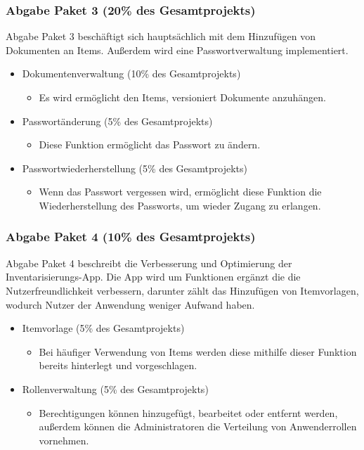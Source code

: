 \documentclass[11pt,a4paper]{report}
\begin{document}
\subsubsection{Abgabe Paket 3 (20\% des Gesamtprojekts)}
Abgabe Paket 3 beschäftigt sich hauptsächlich mit dem Hinzufügen von Dokumenten an Items.
Außerdem wird eine Passwortverwaltung implementiert.
\begin{itemize}

\item
  Dokumentenverwaltung (10\% des Gesamtprojekts)

  \begin{itemize}
  \item
    Es wird ermöglicht den Items, versioniert Dokumente anzuhängen. 
  \end{itemize}
  \item
  Passwortänderung (5\% des Gesamtprojekts)

  \begin{itemize}
  \item
    Diese Funktion ermöglicht das Passwort zu ändern.
  \end{itemize}
  
\item
  Passwortwiederherstellung (5\% des Gesamtprojekts)

  \begin{itemize}
  \item
    Wenn das Passwort vergessen wird, ermöglicht diese Funktion die Wiederherstellung des 				Passworts, um wieder Zugang zu erlangen.
  \end{itemize}
  
\end{itemize}
\newpage
\subsubsection{Abgabe Paket 4 (10\% des Gesamtprojekts)}
Abgabe Paket 4 beschreibt die Verbesserung und Optimierung der Inventarisierungs-App.
Die App wird um Funktionen ergänzt die die Nutzerfreundlichkeit verbessern, darunter zählt das Hinzufügen von Itemvorlagen, wodurch Nutzer der Anwendung weniger Aufwand haben.
\begin{itemize}

\item
  Itemvorlage (5\% des Gesamtprojekts)

  \begin{itemize}
  \item
    Bei häufiger Verwendung von Items werden diese mithilfe dieser Funktion bereits hinterlegt
    und vorgeschlagen.
  \end{itemize}
  
\item
  Rollenverwaltung (5\% des Gesamtprojekts)

  \begin{itemize}
  \item
    Berechtigungen können hinzugefügt, bearbeitet oder entfernt werden,
    außerdem können die Administratoren die Verteilung von Anwenderrollen vornehmen.
  \end{itemize}
  
\end{itemize}
\end{document}
